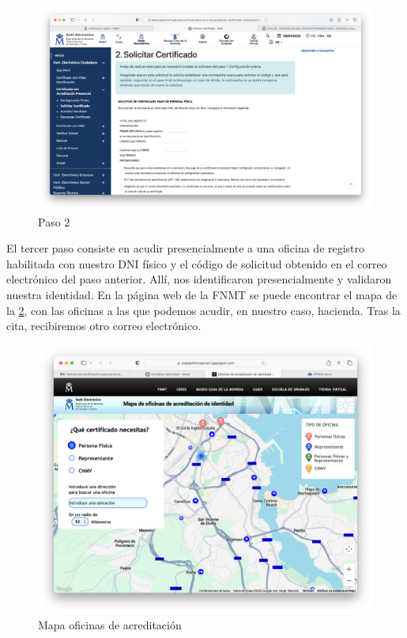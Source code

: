 \begin{figure}[H]   
    \includegraphics[width=\textwidth]{paso2_ej5a.png}
    \caption{Paso 2}
    \label{fig:paso2}
\end{figure}

El tercer paso consiste en acudir presencialmente a una oficina de registro habilitada con nuestro DNI físico y el código de solicitud obtenido en el correo electrónico del paso anterior. Allí, nos identificaron presencialmente y validaron nuestra identidad. En la página web de la FNMT se puede encontrar el mapa de la \ref{fig:mapa}, con las oficinas a las que podemos acudir, en nuestro caso, hacienda. Tras la cita, recibiremos otro correo electrónico. 

\begin{figure}[H]   
    \includegraphics[width=\textwidth]{mapa_ej5a.png}
    \caption{Mapa oficinas de acreditación}
    \label{fig:mapa}
\end{figure}

